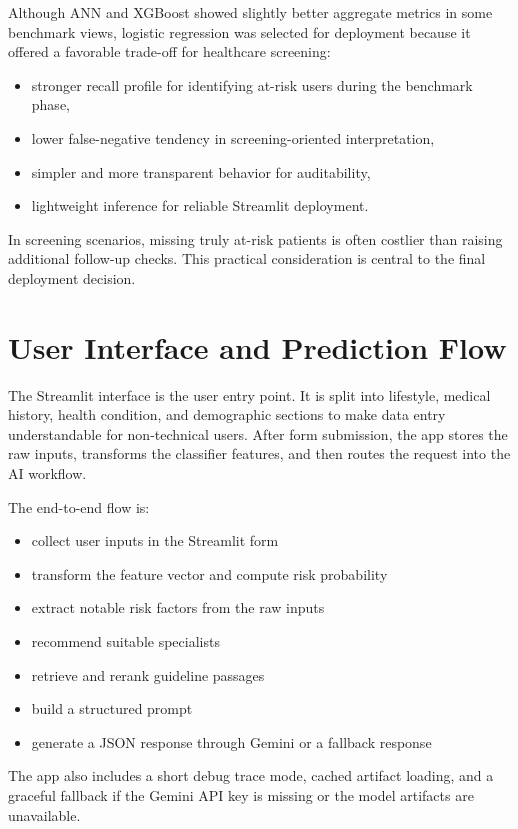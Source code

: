 \documentclass[12pt]{article}
\begin{document}
Although ANN and XGBoost showed slightly better aggregate metrics in some benchmark views, logistic regression was selected for deployment because it offered a favorable trade-off for healthcare screening:

\begin{itemize}
\item stronger recall profile for identifying at-risk users during the benchmark phase,
\item lower false-negative tendency in screening-oriented interpretation,
\item simpler and more transparent behavior for auditability,
\item lightweight inference for reliable Streamlit deployment.
\end{itemize}

In screening scenarios, missing truly at-risk patients is often costlier than raising additional follow-up checks. This practical consideration is central to the final deployment decision.

\section{User Interface and Prediction Flow}

The Streamlit interface is the user entry point. It is split into lifestyle, medical history, health condition, and demographic sections to make data entry understandable for non-technical users. After form submission, the app stores the raw inputs, transforms the classifier features, and then routes the request into the AI workflow.

The end-to-end flow is:

\begin{itemize}
\item collect user inputs in the Streamlit form
\item transform the feature vector and compute risk probability
\item extract notable risk factors from the raw inputs
\item recommend suitable specialists
\item retrieve and rerank guideline passages
\item build a structured prompt
\item generate a JSON response through Gemini or a fallback response
\end{itemize}

The app also includes a short debug trace mode, cached artifact loading, and a graceful fallback if the Gemini API key is missing or the model artifacts are unavailable.
\end{document}
